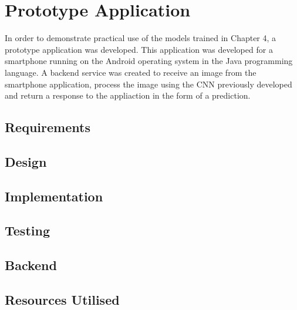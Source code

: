 \chapter{Prototype Application}
\label{prototype}
In order to demonstrate practical use of the models trained in Chapter 4, a prototype application was developed.
This application was developed for a smartphone running on the Android operating system in the Java programming language.
A backend service was created to receive an image from the smartphone application, process the image using the CNN previously developed and return a response to the appliaction in the form of a prediction.

\section{Requirements}


\section{Design}


\section{Implementation}


\section{Testing}


\section{Backend}


\section{Resources Utilised}

